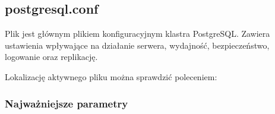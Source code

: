 \documentclass[letterpaper,10pt,english]{sphinxmanual}
\begin{document}
\subsection{postgresql.conf}
\label{\detokenize{rozdzial_2/rozdzial_22/index:postgresql-conf}}
\sphinxAtStartPar
Plik  jest głównym plikiem konfiguracyjnym klastra PostgreSQL.
Zawiera ustawienia wpływające na działanie serwera, wydajność, bezpieczeństwo, logowanie oraz replikację.

\sphinxAtStartPar
Lokalizację aktywnego pliku można sprawdzić poleceniem:

\begin{sphinxVerbatim}[commandchars=\\\{\}]
\end{sphinxVerbatim}


\subsubsection{Najważniejsze parametry}
\label{\detokenize{rozdzial_2/rozdzial_22/index:najwazniejsze-parametry}}
\end{document}
